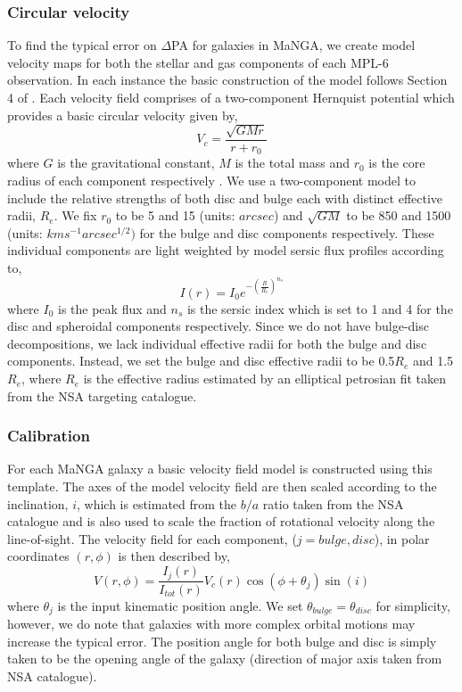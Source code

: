 \subsubsection{Circular velocity}
To find the typical error on $\Delta$PA for galaxies in MaNGA, we create model velocity maps for both the stellar and gas components of each MPL-6 observation. In each instance the basic construction of the model follows Section 4 of \citet{krajnovic2006}. Each velocity field comprises of a two-component Hernquist potential which provides a basic circular velocity given by,
\begin{equation}
V_c = \frac{\sqrt{GMr}}{r+r_0}
\end{equation}
where $G$ is the gravitational constant, $M$ is the total mass and $r_0$ is the core radius of each component respectively \citep{hernquist1990}. We use a two-component model to include the relative strengths of both disc and bulge each with distinct effective radii, $R_e$. We fix $r_0$ to be 5 and 15 (units: $arcsec$) and $\sqrt{GM}$ to be 850 and 1500 (units: $km s^{-1} arcsec^{1/2}) $ for the bulge and disc components respectively. These individual components are light weighted by model sersic flux profiles according to,
\begin{equation}
I(r) = I_0 e^{-\left(\frac{R}{R_e}\right)^{n_s}}
\end{equation}
where $I_{0}$ is the peak flux and $n_s$ is the sersic index which is set to 1 and 4 for the disc and spheroidal components respectively. Since we do not have bulge-disc decompositions, we lack individual effective radii for both the bulge and disc components. Instead, we set the bulge and disc effective radii to be 0.5$R_e$ and 1.5$R_e$, where $R_e$ is the effective radius estimated by an elliptical petrosian fit taken from the NSA targeting catalogue. 

\subsubsection{Calibration}
For each MaNGA galaxy a basic velocity field model is constructed using this template. The axes of the model velocity field are then scaled according to the inclination, $i$, which is estimated from the $b/a$ ratio taken from the NSA catalogue and is also used to scale the fraction of rotational velocity along the line-of-sight. The velocity field for each component, ($j=bulge,disc$), in polar coordinates $(r,\phi)$ is then described by,
\begin{equation}
V(r,\phi) = \frac{I_{j}(r)}{I_{tot}(r)}V_{c}(r)\cos(\phi+\theta_{j})\sin(i)
\end{equation}
where $\theta_j$ is the input kinematic position angle. We set $\theta_{bulge} = \theta_{disc}$ for simplicity, however, we do note that galaxies with more complex orbital motions may increase the typical error. The position angle for both bulge and disc is simply taken to be the opening angle of the galaxy (direction of major axis taken from NSA catalogue). 

